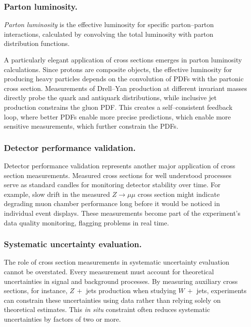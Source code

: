 \begin{definition}
        \subsubsection{Parton luminosity.}
            \begin{definition}
                \emph{Parton luminosity} is the effective luminosity for specific parton--parton interactions, calculated by convolving the total luminosity with parton distribution functions.
            \end{definition}
            A particularly elegant application of cross sections emerges in parton luminosity calculations.
            Since protons are composite objects, the effective luminosity for producing heavy particles depends on the convolution of PDFs with the partonic cross section.
            Measurements of Drell--Yan production at different invariant masses directly probe the quark and antiquark distributions, while inclusive jet production constrains the gluon PDF.
            This creates a self--consistent feedback loop, where better PDFs enable more precise predictions, which enable more sensitive measurements, which further constrain the PDFs.
            
        \subsubsection{Detector performance validation.}
             Detector performance validation represents another major application of cross section measurements.
             Measured cross sections for well understood processes serve as standard candles for monitoring detector stability over time.
             For example, slow drift in the measured \(Z\to\mu\mu\) cross section might indicate degrading muon chamber performance long before it would be noticed in individual event displays.
             These measurements become part of the experiment's data quality monitoring, flagging problems in real time.
            \subsubsection{Systematic uncertainty evaluation.}
                The role of cross section measurements in systematic uncertainty evaluation cannot be overstated.
                Every measurement must account for theoretical uncertainties in signal and background processes.
                By measuring auxiliary cross sections, for instance, \(Z\, +\) jets production when studying \(W\, +\) jets, experiments can constrain these uncertainties using data rather than relying solely on theoretical estimates.
                This \textit{in situ} constraint often reduces systematic uncertainties by factors of two or more.

\end{definition}
